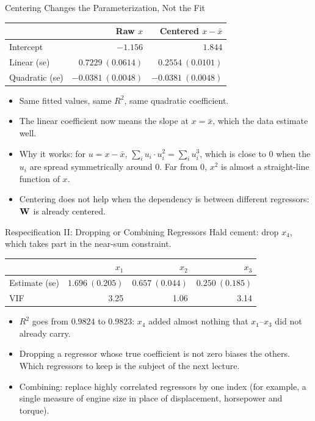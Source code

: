 \begin{frame}{Centering Changes the Parameterization, Not the Fit}
    \begin{center}
        \small
        \begin{tabular}{lrr}
            \toprule
            & Raw $x$ & Centered $x-\bar x$ \\
            \midrule
            Intercept & $-1.156$ & $1.844$ \\
            Linear (se) & $0.7229\ (0.0614)$ & $0.2554\ (0.0101)$ \\
            Quadratic (se) & $-0.0381\ (0.0048)$ & $-0.0381\ (0.0048)$ \\
            \bottomrule
        \end{tabular}
    \end{center}
    \begin{itemize}
        \item Same fitted values, same $R^2$, same quadratic coefficient.
        \item The linear coefficient now means the slope at $x=\bar x$, which the data estimate well.
        \item Why it works: for $u=x-\bar x$, $\sum_iu_i\cdot u_i^2=\sum_iu_i^3$, which is close to 0 when the $u_i$ are spread symmetrically around 0. Far from 0, $x^2$ is almost a straight-line function of $x$.
        \item Centering does not help when the dependency is between different regressors: $\mathbf{W}$ is already centered.
    \end{itemize}
\end{frame}


\begin{frame}{Respecification II: Dropping or Combining Regressors}
    Hald cement: drop $x_4$, which takes part in the near-sum constraint.
    \begin{center}
        \small
        \begin{tabular}{lrrr}
            \toprule
            & $x_1$ & $x_2$ & $x_3$ \\
            \midrule
            Estimate (se) & $1.696\ (0.205)$ & $0.657\ (0.044)$ & $0.250\ (0.185)$ \\
            VIF & 3.25 & 1.06 & 3.14 \\
            \bottomrule
        \end{tabular}
    \end{center}
    \begin{itemize}
        \item $R^2$ goes from $0.9824$ to $0.9823$: $x_4$ added almost nothing that $x_1$--$x_3$ did not already carry.
        \item Dropping a regressor whose true coefficient is not zero biases the others. Which regressors to keep is the subject of the next lecture.
        \item Combining: replace highly correlated regressors by one index (for example, a single measure of engine size in place of displacement, horsepower and torque).
    \end{itemize}
\end{frame}


